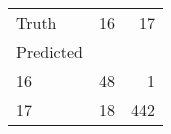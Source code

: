 \begin{tabular}{lrr}
\toprule
Truth & 16 & 17 \\
Predicted &  &  \\
\midrule
16 & 48 & 1 \\
17 & 18 & 442 \\
\bottomrule
\end{tabular}
